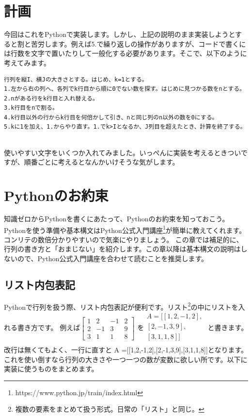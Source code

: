 \documentclass[lualatex,paper=a4paper]{jlreq}
\begin{document}
\section{計画}\label{plan}
今回はこれをPythonで実装します。しかし、上記の説明のまま実装しようとすると割と苦労します。例えば5.で繰り返しの操作がありますが、コードで書くには行数を文字で置いたりして一般化する必要があります。そこで、以下のように考えてみます。\\
\hrulefill
\begin{verbatim}
行列を縦I、横Jの大きさとする。はじめ、k=1とする。
1.左から右の列へ、各列でk行目から順に0でない数を探す。はじめに見つかる数をnとする。
2.nがある行をk行目と入れ替える。
3.k行目をnで割る。
4.k行目以外の行からk行目を何倍かして引き、nと同じ列のn以外の数を0にする。
5.kに1を加え、1.からやり直す。1.でk>Iとなるか、J列目を超えたとき、計算を終了する。
\end{verbatim}
\hrulefill\\
使いやすい文字をいくつか入れてみました。いっぺんに実装を考えるときついですが、順番ごとに考えるとなんかいけそうな気がします。
\newpage
\section{Pythonのお約束}
知識ゼロからPythonを書くにあたって、Pythonのお約束を知っておこう。Pythonを使う準備や基本構文はPython公式入門講座\footnote{https://www.python.jp/train/index.html}が簡単に教えてくれます。コンリテの数倍分かりやすいので気楽にやりましょう。
この章では補足的に、行列の書き方と「おまじない」を紹介します。この章以降は基本構文の説明はしないので、Python公式入門講座を合わせて読むことを推奨します。

\subsection{リスト内包表記}
Pythonで行列を扱う際、リスト内包表記が便利です。リスト\footnote{複数の要素をまとめて扱う形式。日常の「リスト」と同じ。}の中にリストを入れる書き方です。
例えば$\begin{bmatrix}
        1 & 2  & -1 & 2 \\
        2 & -1 & 3  & 9 \\
        3 & 1  & 1  & 8
    \end{bmatrix}$
を$\begin{aligned}
        A =[[1,2,-1,2], \\
        [2,-1,3,9],     \\
        [3, 1,1,8]]     \\
    \end{aligned}$
と書きます。\\改行は無くてもよく、一行に直すと
A =[[1,2,-1,2],[2,-1,3,9],[3,1,1,8]]となります。\\
これを使い倒すなら行列の大きさや一つ一つの数が変数に欲しい所です。以下に実装に使うものをまとめます。
\end{document}
